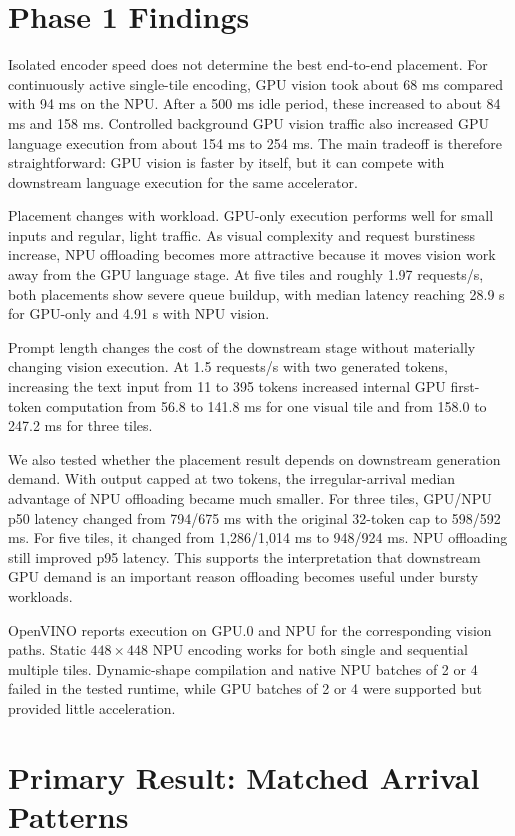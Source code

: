\documentclass[10pt]{article}
\begin{document}
\section{Phase 1 Findings}

Isolated encoder speed does not determine the best end-to-end placement. For continuously active single-tile encoding, GPU vision took about 68 ms compared with 94 ms on the NPU. After a 500 ms idle period, these increased to about 84 ms and 158 ms. Controlled background GPU vision traffic also increased GPU language execution from about 154 ms to 254 ms. The main tradeoff is therefore straightforward: GPU vision is faster by itself, but it can compete with downstream language execution for the same accelerator.

Placement changes with workload. GPU-only execution performs well for small inputs and regular, light traffic. As visual complexity and request burstiness increase, NPU offloading becomes more attractive because it moves vision work away from the GPU language stage. At five tiles and roughly 1.97 requests/s, both placements show severe queue buildup, with median latency reaching 28.9 s for GPU-only and 4.91 s with NPU vision.

Prompt length changes the cost of the downstream stage without materially changing vision execution. At 1.5 requests/s with two generated tokens, increasing the text input from 11 to 395 tokens increased internal GPU first-token computation from 56.8 to 141.8 ms for one visual tile and from 158.0 to 247.2 ms for three tiles.

We also tested whether the placement result depends on downstream generation demand. With output capped at two tokens, the irregular-arrival median advantage of NPU offloading became much smaller. For three tiles, GPU/NPU p50 latency changed from 794/675 ms with the original 32-token cap to 598/592 ms. For five tiles, it changed from 1,286/1,014 ms to 948/924 ms. NPU offloading still improved p95 latency. This supports the interpretation that downstream GPU demand is an important reason offloading becomes useful under bursty workloads.

OpenVINO reports execution on GPU.0 and NPU for the corresponding vision paths. Static \(448\times448\) NPU encoding works for both single and sequential multiple tiles. Dynamic-shape compilation and native NPU batches of 2 or 4 failed in the tested runtime, while GPU batches of 2 or 4 were supported but provided little acceleration.

\section{Primary Result: Matched Arrival Patterns}
\end{document}

